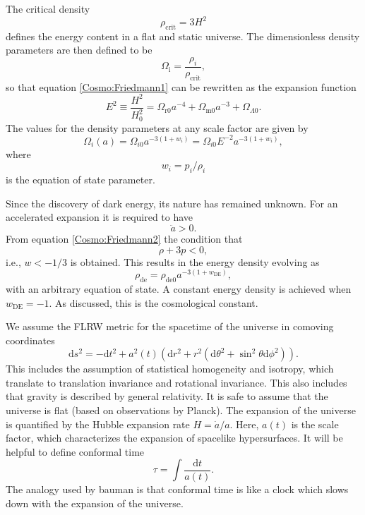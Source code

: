 \documentclass[12pt]{article}
\begin{document}
The critical density
\begin{equation}
    \rho_{\mathrm{crit}} = 3H^2
\end{equation}
defines the energy content in a flat and static universe. The dimensionless density parameters are then defined to be
\begin{equation}
    \Omega_{\mathrm{i}} = \frac{\rho_i}{\rho_{\mathrm{crit}}},
\end{equation}
so that equation \eqref{Cosmo:Friedmann1} can be rewritten as the expansion function
\begin{equation}
    E^2 \equiv \frac{H^2}{H_0^2} = \Omega_{\mathrm{r}0} a^{-4} + \Omega_{\mathrm{m}0} a^{-3} + \Omega_{\Lambda0}.
\end{equation}
The values for the density parameters at any scale factor are given by 
\begin{equation}
    \Omega_i(a) = \Omega_{i0} a^{-3(1+w_i)} = \Omega_{i0} E^{-2}a^{-3(1+w_i)} ,
\end{equation}
where 
\begin{equation}
    w_i = p_i / \rho_i
\end{equation}
is the equation of state parameter.

Since the discovery of dark energy, its nature has remained unknown. For an accelerated expansion it is required to have
\begin{equation}
    \ddot{a} > 0. 
\end{equation}
From equation \eqref{Cosmo:Friedmann2} the condition that 
\begin{equation}
    \rho + 3p < 0, 
\end{equation} 
i.e., $w < -1/3$ is obtained. This results in the energy density evolving as 
\begin{equation}
    \rho_{\mathrm{de}} = \rho_{\mathrm{de}0} a^{-3(1+w_{\mathrm{DE}})}, 
\end{equation} 
with an arbitrary equation of state. A constant energy density is achieved when $w_{\mathrm{DE}} = -1$. As discussed, this is the cosmological constant.
 

We assume the FLRW metric for the spacetime of the universe in comoving coordinates
\begin{equation}
    \mathrm{d}s^2 = -\mathrm{d}t^2 + a^2(t)\left(\mathrm{d}r^2 + r^2(\mathrm{d}\theta^2 + \sin^2\theta \mathrm{d}\phi^2)\right).
\end{equation}
This includes the assumption of statistical homogeneity and isotropy, which translate to translation invariance and rotational invariance. This also includes that gravity is described by general relativity. It is safe to assume that the universe is flat (based on observations by Planck). The expansion of the universe is quantified by the Hubble expansion rate $H= \dot{a}/a$. Here, $a(t)$ is the scale factor, which characterizes the expansion of spacelike hypersurfaces. It will be helpful to define conformal time
\begin{equation}
    \tau = \int \frac{\mathrm{d}t}{a(t)}.
\end{equation}
The analogy used by bauman is that conformal time is like a clock which slows down with the expansion of the universe. 
\end{document}
